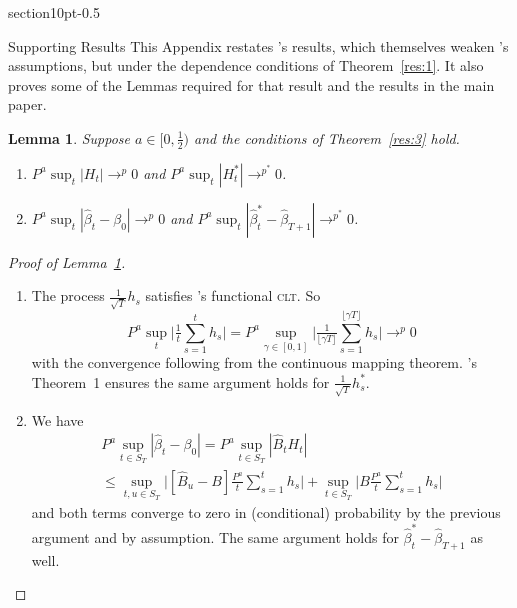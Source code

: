 \documentclass[11pt,fleqn]{article}
\makeatletter
\newcommand\citepos[2][]{\citeauthor{#2}'s \citeyearpar[#1]{#2}}
\renewcommand\section{\@startsection%
{section}{1}{0pt}{-\baselineskip}{0.5\baselineskip}%
{\normalfont\normalsize\bfseries\large\raggedright}}
\newtheorem{lema}{Lemma}[section]
\theoremstyle{definition}
\newcommand{\clt}{\textsc{clt}}
\makeatother
\begin{document}
\appendix
\section{Supporting Results}
This Appendix restates \citepos{Mcc:00} results, which themselves
weaken \citepos{Wes:96} assumptions, but under the dependence
conditions of Theorem~\ref{res:1}.  It also proves some of the Lemmas
required for that result and the results in the main paper.

\begin{lema}\label{res:a2}
  Suppose $a \in [0,\frac12)$ and the conditions of Theorem~\ref{res:3}
  hold.
  \begin{enumerate}
  \item $P^a \sup_t | H_{t} | \to^p 0$ and $P^a \sup_t | H_{t}^{*} |
    \to^{p^{*}} 0$.
  \item $P^a \sup_t | \hat{\beta}_{t} - \beta_{0} | \to^{p} 0$ and
    $P^a \sup_t | \hat{\beta}^{*}_{t} - \hat{\beta}_{T+1} |
    \to^{p^{*}} 0$.
  \end{enumerate}
\end{lema}

\begin{proof}[Proof of Lemma~\ref{res:a2}] \quad
  \begin{enumerate}
  \item The process $\tfrac{1}{\sqrt{T}} h_{s}$ satisfies \citepos[Theorem
    3.1]{JoD:00b} functional \clt.  So
    \begin{equation}
      P^a \sup_t \Big| \tfrac1t \sum_{s=1}^t h_{s} \Big| =
      P^a \sup_{\gamma \in [0,1]} \Big| \tfrac{1}{\lfloor \gamma
        T\rfloor} \sum_{s=1}^{\lfloor \gamma T \rfloor} h_{s} \Big| \to^{p} 0
    \end{equation}
    with the convergence following from the continuous mapping
    theorem.  \citepos{Cal:11d} Theorem~1 ensures the same argument
    holds for $\tfrac{1}{\sqrt{T}} h_s^{*}$.
  \item We have
    \begin{multline}
      P^a \sup_{t \in S_T} | \hat{\beta}_t - \beta_0 | = P^a \sup_{t
        \in S_T} |\hat{B}_{t} H_{t}| \\ \leq \sup_{t,u \in S_T} \Big|
      [ \hat{B}_u - B] \tfrac{P^a}{t} \sum_{s=1}^t h_{s} \Big| + \sup_{t\in S_T} \Big|
      B \tfrac{P^a}{t} \sum_{s=1}^t h_{s} \Big|
    \end{multline}
    and both terms converge to zero in (conditional) probability by
    the previous argument and by assumption.  The same argument holds
    for $\hat{\beta}_t^{*} - \hat{\beta}_{T+1}$ as well.
  \end{enumerate}
\end{proof}
\end{document}
